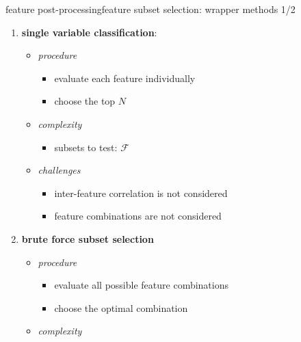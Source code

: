 		\begin{frame}{feature post-processing}{feature subset selection: wrapper methods 1/2}
			\begin{enumerate}
				\item	\textbf{single variable classification}:
                    \begin{itemize}
                        \item   \textit{procedure}
                            \begin{itemize}
                                \item   evaluate each feature individually
                                \item   choose the top $N$
                            \end{itemize}
                        \item<2->  \textit{complexity} 
                            \begin{itemize}
                                \item   subsets to test: $\mathcal{F}$
                            \end{itemize}
                        \item<3->   \textit{challenges}
                            \begin{itemize}
                                \item	inter-feature correlation is not considered
                                \item	feature combinations are not considered
                            \end{itemize}
                    \end{itemize}
				\bigskip 
                \item<4->	\textbf{brute force subset selection}
                    \begin{itemize}
                        \item   \textit{procedure}
                            \begin{itemize}
                                \item   evaluate all possible feature combinations
                                \item   choose the optimal combination
                            \end{itemize}
                        \item<5->  \textit{complexity} 
                            \begin{itemize}

\end{itemize}
\end{itemize}
\end{enumerate}
\end{frame}

